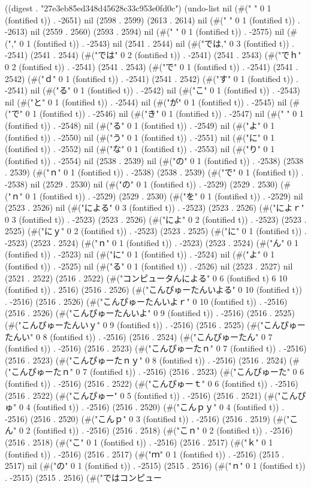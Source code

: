 
((digest . "27e3eb85ed348d45628c33c953e0fd0c") (undo-list nil (#("
" 0 1 (fontified t)) . -2651) nil (2598 . 2599) (2613 . 2614) nil (#("
" 0 1 (fontified t)) . -2613) nil (2559 . 2560) (2593 . 2594) nil (#("
" 0 1 (fontified t)) . -2575) nil (#("," 0 1 (fontified t)) . -2543) nil (2541 . 2544) nil (#("では," 0 3 (fontified t)) . -2541) (2541 . 2544) (#("では" 0 2 (fontified t)) . -2541) (2541 . 2543) (#("でｈ" 0 2 (fontified t)) . -2541) (2541 . 2543) (#("で" 0 1 (fontified t)) . -2541) (2541 . 2542) (#("ｄ" 0 1 (fontified t)) . -2541) (2541 . 2542) (#("す" 0 1 (fontified t)) . -2541) nil (#("る" 0 1 (fontified t)) . -2542) nil (#("こ" 0 1 (fontified t)) . -2543) nil (#("と" 0 1 (fontified t)) . -2544) nil (#("が" 0 1 (fontified t)) . -2545) nil (#("で" 0 1 (fontified t)) . -2546) nil (#("き" 0 1 (fontified t)) . -2547) nil (#("
" 0 1 (fontified t)) . -2548) nil (#("る" 0 1 (fontified t)) . -2549) nil (#("よ" 0 1 (fontified t)) . -2550) nil (#("う" 0 1 (fontified t)) . -2551) nil (#("に" 0 1 (fontified t)) . -2552) nil (#("な" 0 1 (fontified t)) . -2553) nil (#("り" 0 1 (fontified t)) . -2554) nil (2538 . 2539) nil (#("の" 0 1 (fontified t)) . -2538) (2538 . 2539) (#("ｎ" 0 1 (fontified t)) . -2538) (2538 . 2539) (#("で" 0 1 (fontified t)) . -2538) nil (2529 . 2530) nil (#("の" 0 1 (fontified t)) . -2529) (2529 . 2530) (#("ｎ" 0 1 (fontified t)) . -2529) (2529 . 2530) (#("を" 0 1 (fontified t)) . -2529) nil (2523 . 2526) nil (#("による" 0 3 (fontified t)) . -2523) (2523 . 2526) (#("によｒ" 0 3 (fontified t)) . -2523) (2523 . 2526) (#("によ" 0 2 (fontified t)) . -2523) (2523 . 2525) (#("にｙ" 0 2 (fontified t)) . -2523) (2523 . 2525) (#("に" 0 1 (fontified t)) . -2523) (2523 . 2524) (#("ｎ" 0 1 (fontified t)) . -2523) (2523 . 2524) (#("ん" 0 1 (fontified t)) . -2523) nil (#("に" 0 1 (fontified t)) . -2524) nil (#("よ" 0 1 (fontified t)) . -2525) nil (#("る" 0 1 (fontified t)) . -2526) nil (2523 . 2527) nil (2521 . 2522) (2516 . 2522) (#("コンピュータんによる" 0 6 (fontified t) 6 10 (fontified t)) . 2516) (2516 . 2526) (#("こんぴゅーたんいよる" 0 10 (fontified t)) . -2516) (2516 . 2526) (#("こんぴゅーたんいよｒ" 0 10 (fontified t)) . -2516) (2516 . 2526) (#("こんぴゅーたんいよ" 0 9 (fontified t)) . -2516) (2516 . 2525) (#("こんぴゅーたんいｙ" 0 9 (fontified t)) . -2516) (2516 . 2525) (#("こんぴゅーたんい" 0 8 (fontified t)) . -2516) (2516 . 2524) (#("こんぴゅーたん" 0 7 (fontified t)) . -2516) (2516 . 2523) (#("こんぴゅーたｎ" 0 7 (fontified t)) . -2516) (2516 . 2523) (#("こんぴゅーたｎｙ" 0 8 (fontified t)) . -2516) (2516 . 2524) (#("こんぴゅーたｎ" 0 7 (fontified t)) . -2516) (2516 . 2523) (#("こんぴゅーた" 0 6 (fontified t)) . -2516) (2516 . 2522) (#("こんぴゅーｔ" 0 6 (fontified t)) . -2516) (2516 . 2522) (#("こんぴゅー" 0 5 (fontified t)) . -2516) (2516 . 2521) (#("こんぴゅ" 0 4 (fontified t)) . -2516) (2516 . 2520) (#("こんｐｙ" 0 4 (fontified t)) . -2516) (2516 . 2520) (#("こんｐ" 0 3 (fontified t)) . -2516) (2516 . 2519) (#("こん" 0 2 (fontified t)) . -2516) (2516 . 2518) (#("こｎ" 0 2 (fontified t)) . -2516) (2516 . 2518) (#("こ" 0 1 (fontified t)) . -2516) (2516 . 2517) (#("ｋ" 0 1 (fontified t)) . -2516) (2516 . 2517) (#("ｍ" 0 1 (fontified t)) . -2516) (2515 . 2517) nil (#("の" 0 1 (fontified t)) . -2515) (2515 . 2516) (#("ｎ" 0 1 (fontified t)) . -2515) (2515 . 2516) (#("ではコンピュー

